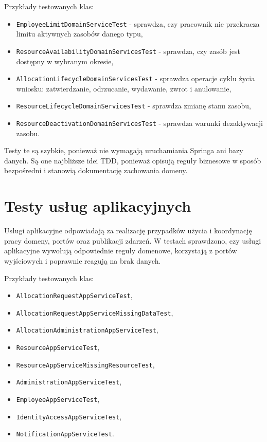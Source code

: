 Przykłady testowanych klas:
\begin{itemize}
    \item \texttt{EmployeeLimitDomainServiceTest} - sprawdza, czy pracownik nie przekracza limitu aktywnych zasobów danego typu,
    \item \texttt{ResourceAvailabilityDomainServicesTest} - sprawdza, czy zasób jest dostępny w wybranym okresie,
    \item \texttt{AllocationLifecycleDomainServicesTest} - sprawdza operacje cyklu życia wniosku: zatwierdzanie, odrzucanie, wydawanie, zwrot i anulowanie,
    \item \texttt{ResourceLifecycleDomainServicesTest} - sprawdza zmianę stanu zasobu,
    \item \texttt{ResourceDeactivationDomainServicesTest} - sprawdza warunki dezaktywacji zasobu.
\end{itemize}

Testy te są szybkie, ponieważ nie wymagają uruchamiania Springa ani bazy danych. Są one najbliższe idei TDD, ponieważ opisują reguły biznesowe w sposób bezpośredni i stanowią dokumentację zachowania domeny.

\section{Testy usług aplikacyjnych}

Usługi aplikacyjne odpowiadają za realizację przypadków użycia i koordynację pracy domeny, portów oraz publikacji zdarzeń. W testach sprawdzono, czy usługi aplikacyjne wywołują odpowiednie reguły domenowe, korzystają z portów wyjściowych i poprawnie reagują na brak danych.

Przykłady testowanych klas:
\begin{itemize}
    \item \texttt{AllocationRequestAppServiceTest},
    \item \texttt{AllocationRequestAppServiceMissingDataTest},
    \item \texttt{AllocationAdministrationAppServiceTest},
    \item \texttt{ResourceAppServiceTest},
    \item \texttt{ResourceAppServiceMissingResourceTest},
    \item \texttt{AdministrationAppServiceTest},
    \item \texttt{EmployeeAppServiceTest},
    \item \texttt{IdentityAccessAppServiceTest},
    \item \texttt{NotificationAppServiceTest}.
\end{itemize}

